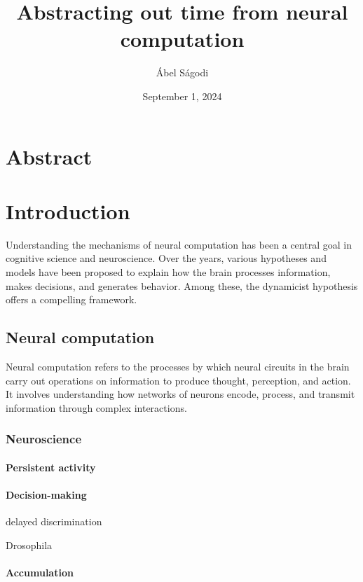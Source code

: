 \documentclass{scrartcl}
\title{Abstracting out time from neural computation} %
\author{\'Abel S\'agodi}
\date{September 1, 2024}
\theoremstyle{definition}
\theoremstyle{remark}
\begin{document}
\maketitle

\section*{Abstract}


\newpage


\section{Introduction}

Understanding the mechanisms of neural computation has been a central goal in cognitive science and neuroscience.
Over the years, various hypotheses and models have been proposed to explain how the brain processes information, makes decisions, and generates behavior.
Among these, the dynamicist hypothesis offers a compelling framework.


\subsection{Neural computation}

Neural computation refers to the processes by which neural circuits in the brain carry out operations on information to produce thought, perception, and action.
It involves understanding how networks of neurons encode, process, and transmit information through complex interactions.

\subsubsection{Neuroscience}
\paragraph{Persistent activity}

\paragraph{Decision-making}

delayed discrimination \citep{barak2013fixed}

Drosophila \citep{zhao2020neural, li2023dynamics}

\paragraph{Accumulation} %
\end{document}
